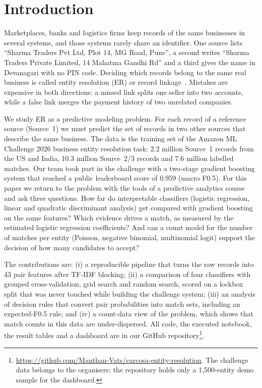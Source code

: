 \section{Introduction}
Marketplaces, banks and logistics firms keep records of the same businesses in several systems, and those
systems rarely share an identifier. One source lists ``Sharma Traders Pvt Ltd, Plot 14, MG Road, Pune'', a second
writes ``Sharma Traders Private Limited, 14 Mahatma Gandhi Rd'' and a third gives the name in Devanagari with
no PIN code. Deciding which records belong to the same real business is called entity resolution (ER) or
record linkage~\cite{fellegi1969,christen2012}. Mistakes are expensive in both directions: a missed link splits
one seller into two accounts, while a false link merges the payment history of two unrelated companies.

We study ER as a predictive modeling problem. For each record of a reference source (Source~1) we must predict the
set of records in two other sources that describe the same business. The data is the training set of the Amazon
ML Challenge 2026 business entity resolution task: 2.2 million Source~1 records from the US and India,
10.3 million Source~2/3 records and 7.6 million labelled matches. Our team took part in the challenge with a
two-stage gradient boosting system that reached a public leaderboard score of 0.959 (macro F0.5).
For this paper we return to the problem with the tools of a predictive analytics course and ask three questions.
How far do interpretable classifiers (logistic regression, linear and quadratic discriminant analysis) get
compared with gradient boosting on the same features? Which evidence drives a match, as measured by the estimated
logistic regression coefficients? And can a count model for the number of matches per entity (Poisson, negative
binomial, multinomial logit) support the decision of how many candidates to accept?

The contributions are: (i) a reproducible pipeline that turns the raw records into 43 pair features after
TF-IDF blocking; (ii) a comparison of four classifiers with grouped cross-validation, grid search and random
search, scored on a lockbox split that was never touched while building the challenge system; (iii) an
analysis of decision rules that convert pair probabilities into match sets, including an expected-F0.5 rule;
and (iv) a count-data view of the problem, which shows that match counts in this data are under-dispersed.
All code, the executed notebook, the result tables and a dashboard are in our GitHub repository\footnote{\url{https://github.com/Manthan-Vats/carcosa-entity-resolution}. The challenge data belongs to the organisers; the repository holds only a 1,500-entity demo sample for the dashboard.}.


